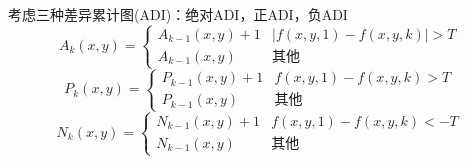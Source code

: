 考虑三种差异累计图(ADI)：绝对ADI，正ADI，负ADI
\[A_{k}(x, y)=\begin{cases}
{A_{k-1}(x, y)+1} & {|f(x, y, 1)-f(x, y, k)|>T} \\
{A_{k-1}(x, y)} & \text{其他}
\end{cases}\]
\[P_{k}(x, y)=\begin{cases}
{P_{k-1}(x, y)+1} & {f(x, y, 1)-f(x, y, k)>T} \\
{P_{k-1}(x, y)} & \text{其他}
\end{cases}\]
\[N_{k}(x, y)=\begin{cases}
{N_{k-1}(x, y)+1} & {f(x, y, 1)-f(x, y, k)<-T} \\
{N_{k-1}(x, y)} & \text{其他}
\end{cases}\]